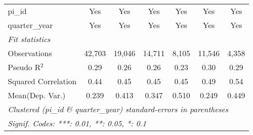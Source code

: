\begin{tabular}{lcccccc}
   pi\_id                                                     & Yes           & Yes           & Yes          & Yes            & Yes           & Yes\\  
   quarter\_year                                              & Yes           & Yes           & Yes          & Yes            & Yes           & Yes\\  
   \midrule
   \emph{Fit statistics}\\
   Observations                                               & 42,703        & 19,046        & 14,711       & 8,105          & 11,546        & 4,358\\  
   Pseudo R$^2$                                               & 0.29          & 0.26          & 0.26         & 0.23           & 0.30          & 0.29\\  
   Squared Correlation                                        & 0.44          & 0.45          & 0.45         & 0.45           & 0.49          & 0.54\\  
Mean(Dep. Var.) & 0.239 & 0.413 & 0.347 & 0.510 & 0.249 & 0.449 \\
   \midrule \midrule
   \multicolumn{7}{l}{\emph{Clustered (pi\_id \& quarter\_year) standard-errors in parentheses}}\\
   \multicolumn{7}{l}{\emph{Signif. Codes: ***: 0.01, **: 0.05, *: 0.1}}\\
\end{tabular}
\par\endgroup
